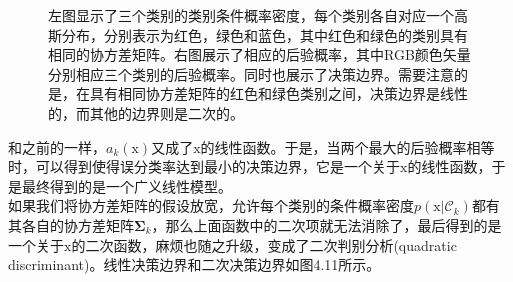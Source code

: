 \documentclass[b5paper]{book}
\numberwithin{equation}{chapter}
\newcommand {\bx} {\boldsymbol{\mathrm{x}}}
\newcommand {\bfSigma} {\boldsymbol{\Sigma}}
\newcommand {\calC} {\mathcal{C}}
\begin{document}
{\begin{figure}[ht]
\begin{minipage}[t]{0.5\linewidth}
		\label{fig:4-11b}
		\end{minipage}
		\caption{左图显示了三个类别的类别条件概率密度，每个类别各自对应一个高斯分布，分别表示为红色，绿色和蓝色，其中红色和绿色的类别具有相同的协方差矩阵。右图展示了相应的后验概率，其中RGB颜色矢量分别相应三个类别的后验概率。同时也展示了决策边界。需要注意的是，在具有相同协方差矩阵的红色和绿色类别之间，决策边界是线性的，而其他的边界则是二次的。}
	\end{figure}
	和之前的一样，$a_k(\bx)$又成了$\bx$的线性函数。于是，当两个最大的后验概率相等时，可以得到使得误分类率达到最小的决策边界，它是一个关于$\bx$的线性函数，于是最终得到的是一个广义线性模型。\\
	\indent 如果我们将协方差矩阵的假设放宽，允许每个类别的条件概率密度$p(\bx|\calC_k)$都有其各自的协方差矩阵$\bfSigma_k$，那么上面函数中的二次项就无法消除了，最后得到的是一个关于$\bx$的二次函数，麻烦也随之升级，变成了二次判别分析(quadratic discriminant)。线性决策边界和二次决策边界如图4.11所示。
	}
\end{document}
